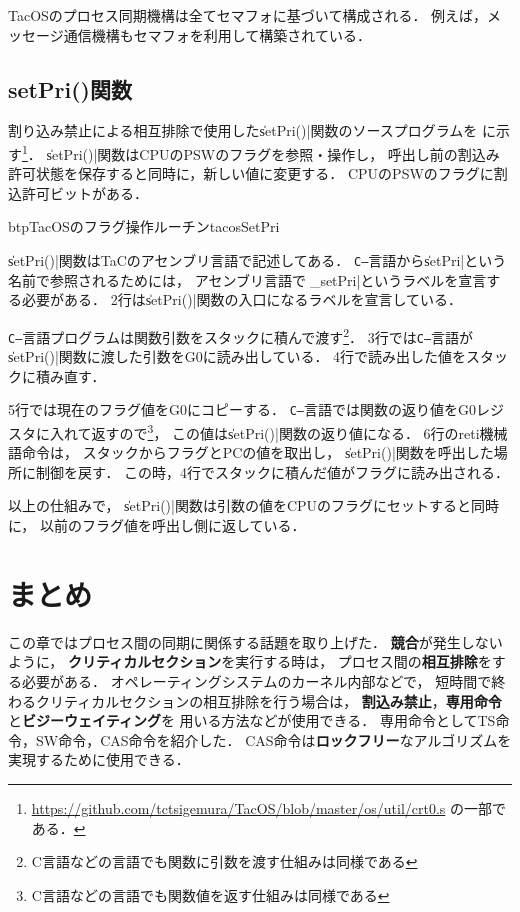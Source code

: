 TacOSのプロセス同期機構は全てセマフォに基づいて構成される．
例えば，メッセージ通信機構もセマフォを利用して構築されている．

\subsection{setPri()関数}
\label{setPri}
割り込み禁止による相互排除で使用した\|setPri()|関数のソースプログラムを
に示す\footnote{
\url{https://github.com/tctsigemura/TacOS/blob/master/os/util/crt0.s}
の一部である．}．
\|setPri()|関数はCPUのPSWのフラグを参照・操作し，
呼出し前の割込み許可状態を保存すると同時に，新しい値に変更する．
CPUのPSWのフラグに割込許可ビットがある．

\begin{myfig}{btp}{TacOSのフラグ操作ルーチン}{tacosSetPri}

\end{myfig}

\|setPri()|関数はTaCのアセンブリ言語で記述してある．
{\tt C--}言語から\|setPri|という名前で参照されるためには，
アセンブリ言語では\|_setPri|というラベルを宣言する必要がある．
2行は\|setPri()|関数の入口になるラベルを宣言している．

{\tt C--}言語プログラムは関数引数をスタックに積んで渡す\footnote{
C言語などの言語でも関数に引数を渡す仕組みは同様である}．
3行では{\tt C--}言語が\|setPri()|関数に渡した引数をG0に読み出している．
4行で読み出した値をスタックに積み直す．

5行では現在のフラグ値をG0にコピーする．
{\tt C--}言語では関数の返り値をG0レジスタに入れて返すので\footnote{
C言語などの言語でも関数値を返す仕組みは同様である}，
この値は\|setPri()|関数の返り値になる．
6行のreti機械語命令は，
スタックからフラグとPCの値を取出し，
\|setPri()|関数を呼出した場所に制御を戻す．
この時，4行でスタックに積んだ値がフラグに読み出される．

以上の仕組みで，
\|setPri()|関数は引数の値をCPUのフラグにセットすると同時に，
以前のフラグ値を呼出し側に返している．

\section{まとめ}
この章ではプロセス間の同期に関係する話題を取り上げた．
{\bf 競合}が発生しないように，
{\bf クリティカルセクション}を実行する時は，
プロセス間の{\bf 相互排除}をする必要がある．
オペレーティングシステムのカーネル内部などで，
短時間で終わるクリティカルセクションの相互排除を行う場合は，
{\bf 割込み禁止}，{\bf 専用命令}と{\bf ビジーウェイティング}を
用いる方法などが使用できる．
専用命令としてTS命令，SW命令，CAS命令を紹介した．
CAS命令は{\bf ロックフリー}なアルゴリズムを実現するために使用できる．

